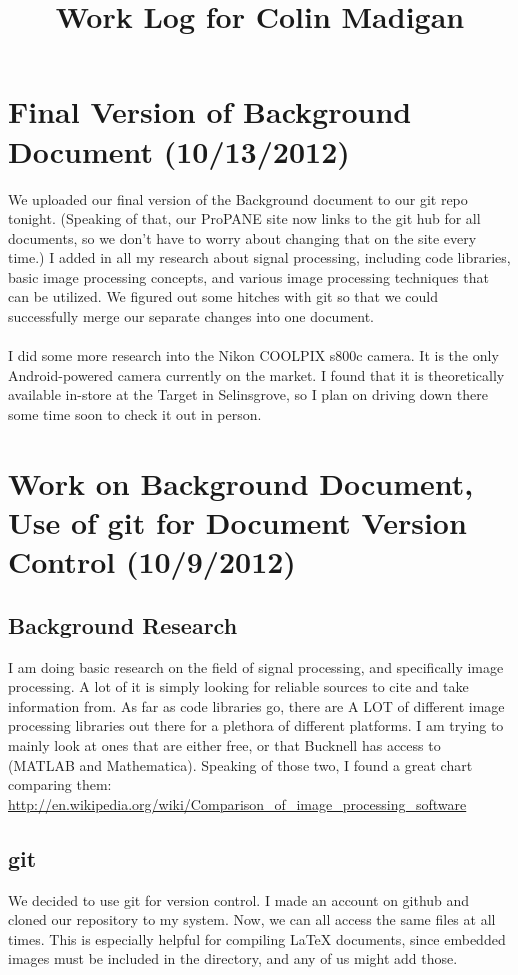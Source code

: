 \documentclass[]{article}
\begin{document}
\title{Work Log for Colin Madigan}
\date{}
\maketitle
	\tableofcontents
	
	\section{Final Version of Background Document (10/13/2012)}
	We uploaded our final version of the Background document to our git repo tonight.  (Speaking of that, our ProPANE site now links to the git hub for all documents, so we don't have to worry about changing that on the site every time.)  I added in all my research about signal processing, including code libraries, basic image processing concepts, and various image processing techniques that can be utilized.  We figured out some hitches with git so that we could successfully merge our separate changes into one document.  \\ \\

I did some more research into the Nikon COOLPIX s800c camera.  It is the only Android-powered camera currently on the market.  I found that it is theoretically available in-store at the Target in Selinsgrove, so I plan on driving down there some time soon to check it out in person.  


	\section{Work on Background Document, Use of git for Document Version Control (10/9/2012)}
	\subsection*{Background Research}
	I am doing basic research on the field of signal processing, and specifically image processing.  A lot of it is simply looking for reliable sources to cite and take information from.  As far as code libraries go, there are A LOT of different image processing libraries out there for a plethora of different platforms.  I am trying to mainly look at ones that are either free, or that Bucknell has access to (MATLAB and Mathematica).  Speaking of those two, I found a great chart comparing them: \url{http://en.wikipedia.org/wiki/Comparison_of_image_processing_software} 

	\subsection*{git}
	We decided to use git for version control.  I made an account on github and cloned our repository to my system.  Now, we can all access the same files at all times. This is especially helpful for compiling LaTeX documents, since embedded images must be included in the directory, and any of us might add those.  
\end{document}
